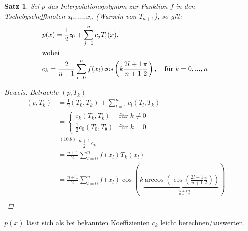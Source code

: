 \documentclass[12pt]{article}
\theoremstyle{break}
\newtheorem{theorem}{Satz}[subsection]
\begin{document}
\begin{theorem}
Sei $p$ das Interpolationspolynom zur Funktion $f$ in den Tschebyscheffknoten $x_0, \dots, x_n$ (Wurzeln von $T_{n+1}$), so gilt:
\begin{align*}
&p(x) = \frac{1}{2} c_0 + \sum_{j=1}^n c_j T_j(x), &\\
\intertext{wobei}
&c_k = \frac{2}{n+1} \sum_{l=0}^n f(x_l) \cos\left(k \frac{2l+1}{n+1}\frac{\pi}{2}\right), \quad \text{für $k=0,...,n$}
\end{align*}

\begin{proof}[Beweis]
Betrachte $(p, T_k)$
\begin{align*}
(p, T_k) &= \frac{1}{2} (T_0, T_k) + \sum_{l=1}^n c_l (T_l, T_k) &\\
&= \begin{cases}
c_k (T_k, T_k) & \text{für }k \neq 0 \\
\frac{1}{2} c_0 (T_0, T_0)  & \text{für }k = 0 
\end{cases}&\\
&\overset{(10.8)}{=} \frac{n+1}{2} c_k&\\
&= \frac{n+1}{2} \sum_{l=0}^n f(x_l) T_k(x_l) &\\
&= \frac{n+1}{2} \sum_{l=0}^n f(x_l) \cos\left(k \underbrace{\arccos\left(\cos\left(\frac{2l+1}{n+1}\frac{\pi}{2}\right)\right)}_{ = \frac{2l+1}{n+1}\frac{\pi}{2}}\right) &\\
\end{align*}
\end{proof}
\end{theorem}
$p(x)$ lässt sich als bei bekannten Koeffizienten $c_k$ leicht berechnen/auswerten.
\end{document}
